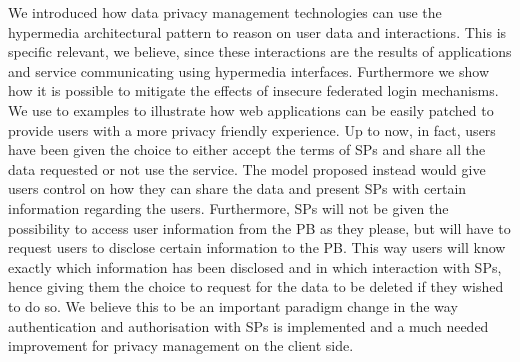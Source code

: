 We introduced how data privacy management technologies can use the hypermedia architectural pattern to reason on user data and interactions. This is specific relevant, we believe, since these interactions are the results of applications and service communicating using hypermedia interfaces. 
Furthermore we show how it is possible to mitigate the effects of insecure federated login mechanisms. We use to examples to illustrate how web applications can be easily patched to provide users with a more privacy friendly experience. Up to now, in fact, users have been given the choice to either accept the terms of SPs and share all the data requested or not use the service. The model proposed instead would give users control on how they can share the data and present SPs with certain information regarding the users. 
Furthermore, SPs will not be given the possibility to access user information from the PB as they please, but will have to request users to disclose certain information to the PB. This way users will know exactly which information has been disclosed and in which interaction with SPs, hence giving them the choice to request for the data to be deleted if they wished to do so.
We believe this to be an important paradigm change in the way authentication and authorisation with SPs is implemented and a much needed improvement for privacy management on the client side.
